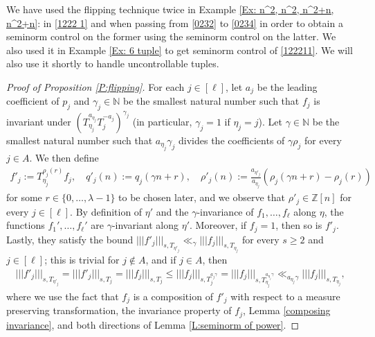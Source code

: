 \documentclass[11pt]{amsart}
\theoremstyle{definition}
\newcommand{\N}{{\mathbb N}}
\newcommand{\Z}{{\mathbb Z}}
\newcommand{\FL}{{\mathfrak L}}
\newcommand{\nnorm}[1]{\lvert\!|\!| #1|\!|\!\rvert}
\newcommand{\brac}[1]{\mathopen{}\left( #1 \mathclose{}\right)}
\begin{document}
We have used the flipping technique twice in Example \ref{Ex: n^2, n^2, n^2+n, n^2+n}: in \eqref{1222 1} and when passing from \eqref{0232} to \eqref{0234} in order to obtain a seminorm control on the former using the seminorm control on the latter. We also used it in Example \ref{Ex: 6 tuple} to get seminorm control of \eqref{122211}. We will also use it shortly to handle uncontrollable tuples.


\begin{proof}[Proof of Proposition \ref{P:flipping}]
For each $j\in[\ell]$, let $a_j$ be the leading coefficient of $p_j$ and  $\gamma_j\in\N$ be the smallest natural number such that $f_j$ is invariant under $\brac{T_{\eta_j}^{a_{\eta_j}}T_j^{-a_j}}^{\gamma_j}$ (in particular, $\gamma_j = 1$ if $\eta_j = j$). Let $\gamma\in\N$ be the smallest natural number such that $a_{\eta_j} \gamma_j$ divides the coefficients of $\gamma \rho_j$ for every $j\in A$.
We then define
\begin{align*}
    f'_j := T_{\eta_j}^{\rho_j(r)}f_j,\quad q'_j(n):=q_j(\gamma n + r),\quad \rho'_{j}(n) := \frac{a_{\eta'_j}}{a_{\eta_{j}}}\brac{\rho_{j}(\gamma n + r) - \rho_{j}(r)}
\end{align*}
for some $r\in\{0, \ldots, \lambda-1\}$ to be chosen later, and we observe that $\rho'_j\in\Z[n]$ for every $j\in [\ell]$. By definition of $\eta'$ and the $\gamma$-invariance of $f_1, \ldots, f_\ell$ along $\eta$, the functions $f_1', \ldots, f_\ell'$ are $\gamma$-invariant along $\eta'$. Moreover, if $f_j =1$, then so is $f'_j$. Lastly, they satisfy the bound $\nnorm{f'_j}_{s, T_{\eta'_j}}\ll_\gamma \nnorm{f_j}_{s, T_{\eta_{j}}}$ for every $s\geq 2$ and $j\in[\ell]$; this is trivial for $j\notin A$, and if $j\in A$, then
\begin{align*}
    \nnorm{f'_j}_{s, T_{\eta'_j}} = \nnorm{f'_j}_{s, T_{j}}= \nnorm{f_j}_{s, T_{j}} \leq \nnorm{f_j}_{s, T_{j}^{a_{j}\gamma}} = \nnorm{f_j}_{s, T_{\eta_{j}}^{a_{\eta_{j}}\gamma}}\ll_{a_{\eta_j} \gamma}\nnorm{f_j}_{s, T_{\eta_j}},
\end{align*}
where we use the fact that $f_j$ is a composition of $f'_j$ with respect to a measure preserving transformation, the invariance property of $f_j$, Lemma \ref{composing invariance}, and both directions of Lemma \ref{L:seminorm of power}.


\end{proof}
\end{document}
